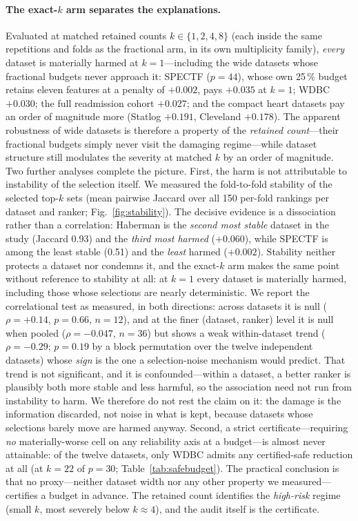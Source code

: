 \documentclass[fleqn,10pt]{wlscirep}
\newcommand{\result}[1]{#1}
\begin{document}
\paragraph{The exact-$k$ arm separates the explanations.} Evaluated at matched retained counts
$k\in\{1,2,4,8\}$ (each inside the same repetitions and folds as the fractional arm, in its own
multiplicity family), \emph{every} dataset is materially harmed at $k=1$---including the wide
datasets whose fractional budgets never approach it: SPECTF ($p=44$), whose own 25\,\% budget retains
eleven features at a penalty of \result{$+0.002$}, pays \result{$+0.035$} at $k=1$; WDBC
\result{$+0.030$}; the full readmission cohort \result{$+0.027$}; and the compact heart datasets pay
an order of magnitude more (Statlog \result{$+0.191$}, Cleveland \result{$+0.178$}). The apparent
robustness of wide datasets is therefore a property of the \emph{retained count}---their fractional
budgets simply never visit the damaging regime---while dataset structure still modulates the severity
at matched $k$ by an order of magnitude. Two further analyses complete the picture. First, the harm is
not attributable to instability of the selection itself. We measured the fold-to-fold stability of the
selected top-$k$ sets (mean pairwise Jaccard over all \result{150} per-fold rankings per dataset and
ranker; Fig.~\ref{fig:stability}). The decisive evidence is a dissociation rather than a correlation:
Haberman is the \emph{second most stable} dataset in the study (Jaccard \result{0.93}) and the
\emph{third most harmed} (\result{$+0.060$}), while SPECTF is among the least stable
(\result{0.51}) and the \emph{least} harmed (\result{$+0.002$}). Stability neither protects a dataset
nor condemns it, and the exact-$k$ arm makes the same point without reference to stability at all:
at $k=1$ every dataset is materially harmed, including those whose selections are nearly
deterministic. We report the correlational test as measured, in both directions: across datasets it
is null ($\rho=\result{+0.14}$, $p=\result{0.66}$, $n=12$), and at the finer (dataset, ranker) level
it is null when pooled ($\rho=\result{-0.047}$, $n=36$) but shows a weak within-dataset trend
($\rho=\result{-0.29}$; $p=\result{0.19}$ by a block permutation over the twelve independent
datasets) whose \emph{sign} is the one a selection-noise mechanism would predict. That trend is not
significant, and it is confounded---within a dataset, a better ranker is plausibly both more stable
and less harmful, so the association need not run from instability to harm. We therefore do not rest
the claim on it: the damage is the information discarded, not noise in what is kept, because
datasets whose selections barely move are harmed anyway.
Second, a strict certificate---requiring \emph{no} materially-worse cell on any reliability axis at a
budget---is almost never attainable: of the twelve datasets, only WDBC admits any certified-safe
reduction at all (at $k=22$ of $p=30$; Table~\ref{tab:safebudget}). The practical conclusion is
that no proxy---neither dataset width nor any other property we measured---certifies a budget in
advance. The retained count
identifies the \emph{high-risk} regime (small $k$, most severely below $k\approx4$), and the audit
itself is the certificate.
\end{document}
